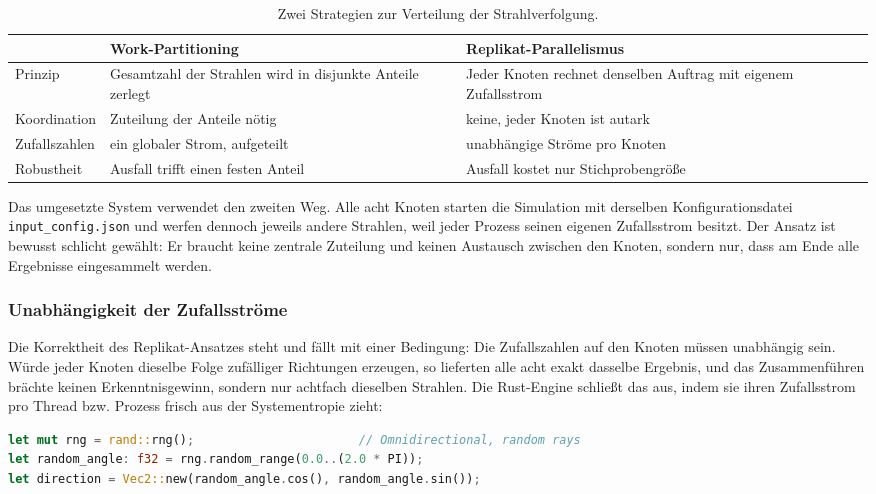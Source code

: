 \begin{table}[htbp]
    \centering
    \caption{Zwei Strategien zur Verteilung der Strahlverfolgung.}
    \label{tab:strategien}
    \begin{tabular}{p{3.2cm} p{5.2cm} p{4.2cm}}
        \toprule
        & \textbf{Work-Partitioning} & \textbf{Replikat-Parallelismus} \\
        \midrule
        Prinzip & Gesamtzahl der Strahlen wird in disjunkte Anteile zerlegt & Jeder Knoten rechnet denselben Auftrag mit eigenem Zufallsstrom \\
        Koordination & Zuteilung der Anteile nötig & keine, jeder Knoten ist autark \\
        Zufallszahlen & ein globaler Strom, aufgeteilt & unabhängige Ströme pro Knoten \\
        Robustheit & Ausfall trifft einen festen Anteil & Ausfall kostet nur Stichprobengröße \\
        \bottomrule
    \end{tabular}
\end{table}

Das umgesetzte System verwendet den zweiten Weg. Alle acht Knoten starten die
Simulation mit derselben Konfigurationsdatei \texttt{input\_config.json} und
werfen dennoch jeweils andere Strahlen, weil jeder Prozess seinen eigenen
Zufallsstrom besitzt. Der Ansatz ist bewusst schlicht gewählt: Er braucht keine
zentrale Zuteilung und keinen Austausch zwischen den Knoten, sondern nur, dass am
Ende alle Ergebnisse eingesammelt werden.

\subsubsection{Unabhängigkeit der Zufallsströme}
\label{subsubsec:rng}

Die Korrektheit des Replikat-Ansatzes steht und fällt mit einer Bedingung: Die
Zufallszahlen auf den Knoten müssen unabhängig sein. Würde jeder Knoten dieselbe
Folge zufälliger Richtungen erzeugen, so lieferten alle acht exakt dasselbe
Ergebnis, und das Zusammenführen brächte keinen Erkenntnisgewinn, sondern nur
achtfach dieselben Strahlen. Die Rust-Engine schließt das aus, indem sie ihren
Zufallsstrom pro Thread bzw. Prozess frisch aus der Systementropie zieht:

\begin{lstlisting}[style=clusterlst, language=Rust, caption={Initialisierung des Zufallsstroms pro Prozess (\texttt{simulation.rs}).}]
let mut rng = rand::rng();                       // Omnidirectional, random rays
let random_angle: f32 = rng.random_range(0.0..(2.0 * PI));
let direction = Vec2::new(random_angle.cos(), random_angle.sin());
\end{lstlisting}

